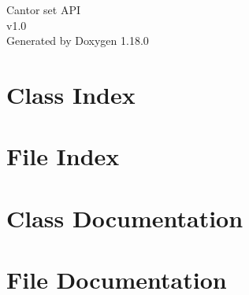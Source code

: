 \documentclass[twoside]{book}
\newcommand{\+}{\discretionary{\mbox{\scriptsize$\hookleftarrow$}}{}{}}
\newcommand{\clearemptydoublepage}{%
    \newpage{\pagestyle{empty}\cleardoublepage}%
  }
\begin{document}
  \raggedbottom
    \hypersetup{pageanchor=false,
                bookmarksnumbered=true,
                pdfencoding=unicode
               }
  \begin{titlepage}
  \vspace*{7cm}
  \begin{center}%
  {\Large Cantor set API}\\
  [1ex]\large v1.\+0 \\
  \vspace*{1cm}
  {\large Generated by Doxygen 1.18.0}\\
  \end{center}
  \end{titlepage}
  \clearemptydoublepage
  \tableofcontents
  \clearemptydoublepage
  \hypersetup{pageanchor=true}
\chapter{Class Index}

\chapter{File Index}

\chapter{Class Documentation}


\chapter{File Documentation}



  \backmatter
  \newpage
  \clearemptydoublepage
  \printindex
\end{document}
